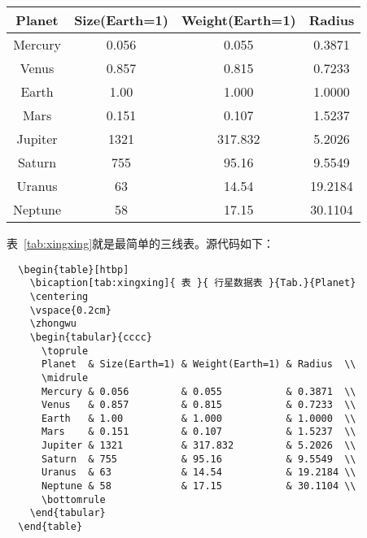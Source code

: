 \begin{table}[htbp]
  \centering
  \vspace{0.2cm}
  \zhongwu
  \begin{tabular}{cccc}
    \toprule
    Planet  & Size(Earth=1) & Weight(Earth=1) & Radius  \\
    \midrule
    Mercury & 0.056         & 0.055           & 0.3871  \\
    Venus   & 0.857         & 0.815           & 0.7233  \\
    Earth   & 1.00          & 1.000           & 1.0000  \\
    Mars    & 0.151         & 0.107           & 1.5237  \\ 
    Jupiter & 1321          & 317.832         & 5.2026  \\ 
    Saturn  & 755           & 95.16           & 9.5549  \\ 
    Uranus  & 63            & 14.54           & 19.2184 \\ 
    Neptune & 58            & 17.15           & 30.1104 \\ 
    \bottomrule
  \end{tabular}
\end{table}

表~\ref{tab:xingxing}就是最简单的三线表。源代码如下：
\begin{lstlisting}
  \begin{table}[htbp]
    \bicaption[tab:xingxing]{ 表 }{ 行星数据表 }{Tab.}{Planet}
    \centering
    \vspace{0.2cm}
    \zhongwu
    \begin{tabular}{cccc}
      \toprule
      Planet  & Size(Earth=1) & Weight(Earth=1) & Radius  \\
      \midrule
      Mercury & 0.056         & 0.055           & 0.3871  \\
      Venus   & 0.857         & 0.815           & 0.7233  \\ 
      Earth   & 1.00          & 1.000           & 1.0000  \\ 
      Mars    & 0.151         & 0.107           & 1.5237  \\ 
      Jupiter & 1321          & 317.832         & 5.2026  \\ 
      Saturn  & 755           & 95.16           & 9.5549  \\ 
      Uranus  & 63            & 14.54           & 19.2184 \\ 
      Neptune & 58            & 17.15           & 30.1104 \\
      \bottomrule
    \end{tabular}
  \end{table}
\end{lstlisting}


